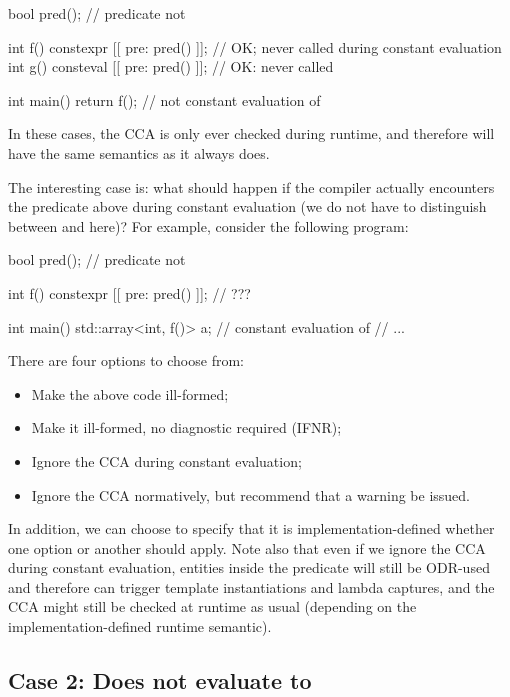 \begin{codeblock}
bool pred();  // predicate not 

int f() constexpr [[ pre: pred() ]];  // OK; never called during constant evaluation
int g() consteval [[ pre: pred() ]];  // OK: never called

int main() {
  return f();  // not constant evaluation of 
}
\end{codeblock}

In these cases, the CCA is only ever checked during runtime, and therefore will have the same semantics as it always does.

The interesting case is: what should happen if the compiler actually encounters the predicate above during constant evaluation (we do not have to distinguish between  and  here)? For example, consider the following program:

\begin{codeblock}
bool pred();  // predicate not 

int f() constexpr [[ pre: pred() ]];  // ???

int main() {
  std::array<int, f()> a;  // constant evaluation of 
  // ...
}
\end{codeblock}

There are four options to choose from:

\begin{itemize}
\item Make the above code ill-formed;
\item Make it ill-formed, no diagnostic required (IFNR);
\item Ignore the CCA during constant evaluation;
\item Ignore the CCA normatively, but recommend that a warning be issued.
\end{itemize}

In addition, we can choose to specify that it is implementation-defined whether one option or another should apply. Note also that even if we ignore the CCA during constant evaluation, entities inside the predicate will still be ODR-used and therefore can trigger template instantiations and lambda captures, and the CCA might still be checked at runtime as usual (depending on the implementation-defined runtime semantic).

\subsection{Case 2: Does not evaluate to }

